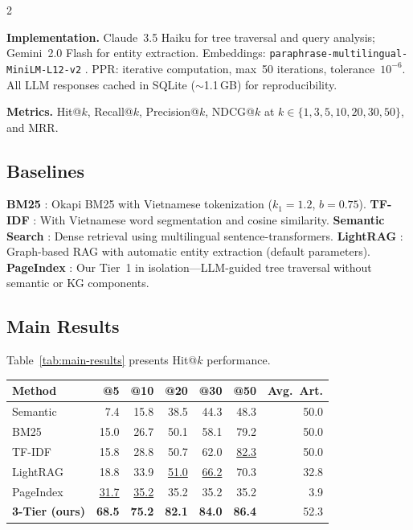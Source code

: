 \documentclass[11pt,a4paper]{article}
\begin{document}
\begin{multicols}{2}

\textbf{Implementation.} Claude~3.5 Haiku for tree traversal and query analysis; Gemini~2.0 Flash for entity extraction. Embeddings: \texttt{paraphrase-multilingual-MiniLM-L12-v2} \cite{ref_sbert}. PPR: iterative computation, max~50 iterations, tolerance~$10^{-6}$. All LLM responses cached in SQLite ($\sim$1.1\,GB) for reproducibility.

\textbf{Metrics.} Hit@$k$, Recall@$k$, Precision@$k$, NDCG@$k$ at $k \in \{1,3,5,10,20,30,50\}$, and MRR.

\subsection{Baselines}

\textbf{BM25} \cite{ref1}: Okapi BM25 with Vietnamese tokenization ($k_1\!=\!1.2$, $b\!=\!0.75$). \textbf{TF-IDF} \cite{ref11}: With Vietnamese word segmentation and cosine similarity. \textbf{Semantic Search} \cite{ref_sbert}: Dense retrieval using multilingual sentence-transformers. \textbf{LightRAG} \cite{ref5}: Graph-based RAG with automatic entity extraction (default parameters). \textbf{PageIndex} \cite{ref14}: Our Tier~1 in isolation---LLM-guided tree traversal without semantic or KG components.

\subsection{Main Results}

Table~\ref{tab:main-results} presents Hit@$k$ performance.

\vspace{0.3em}
\noindent
\centering\small
{}
\label{tab:main-results}
\begin{tabular}{l@{\hskip 3pt}r@{\hskip 3pt}r@{\hskip 3pt}r@{\hskip 3pt}r@{\hskip 3pt}r@{\hskip 3pt}r}
\toprule
\textbf{Method} & \textbf{@5} & \textbf{@10} & \textbf{@20} & \textbf{@30} & \textbf{@50} & \textbf{Avg.~Art.} \\
\midrule
Semantic & 7.4 & 15.8 & 38.5 & 44.3 & 48.3 & 50.0 \\
BM25 & 15.0 & 26.7 & 50.1 & 58.1 & 79.2 & 50.0 \\
TF-IDF & 15.8 & 28.8 & 50.7 & 62.0 & \underline{82.3} & 50.0 \\
LightRAG & 18.8 & 33.9 & \underline{51.0} & \underline{66.2} & 70.3 & 32.8 \\
PageIndex & \underline{31.7} & \underline{35.2} & 35.2 & 35.2 & 35.2 & 3.9 \\
\textbf{3-Tier (ours)} & \textbf{68.5} & \textbf{75.2} & \textbf{82.1} & \textbf{84.0} & \textbf{86.4} & 52.3 \\
\bottomrule
\end{tabular}
\normalsize
\justifying
\vspace{0.3em}


\end{multicols}
\end{document}
